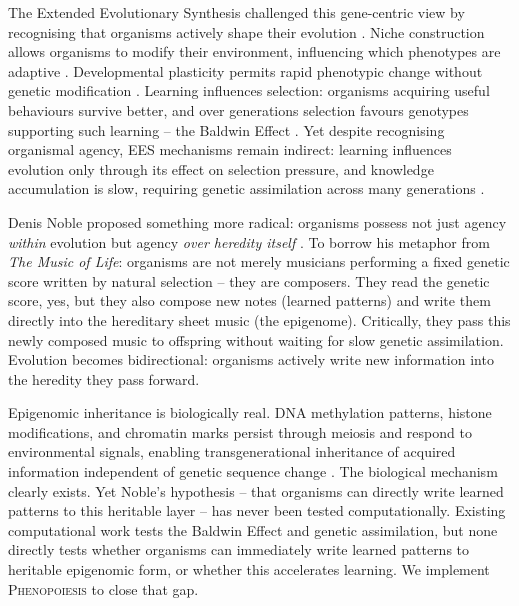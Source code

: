 \documentclass[11pt]{article}
\newcommand{\Pheno}{\textsc{Phenopoiesis}}
\begin{document}
The Extended Evolutionary Synthesis challenged this gene-centric view by
recognising that organisms actively shape their evolution
\citep{LalandEtAl2015,Uller2015,WestEberhard2003}. Niche construction allows
organisms to modify their environment, influencing which phenotypes are adaptive
\citep{OdlingSmee2003}. Developmental plasticity permits rapid phenotypic change
without genetic modification \citep{WestEberhard2003,FuscoMinelli2010}. Learning
influences selection: organisms acquiring useful behaviours survive better, and
over generations selection favours genotypes supporting such learning -- the
Baldwin Effect \citep{Baldwin1896,HintonNowlan1987}. Yet despite recognising
organismal agency, EES mechanisms remain indirect: learning influences evolution
only through its effect on selection pressure, and knowledge accumulation is
slow, requiring genetic assimilation across many generations
\citep{Waddington1942,Waddington1956}.

Denis Noble proposed something more radical: organisms possess not just agency
\emph{within} evolution but agency \emph{over heredity itself}
\citep{Noble2016,Noble2017,Noble2021}. To borrow his metaphor from \emph{The
Music of Life}: organisms are not merely musicians performing a fixed genetic
score written by natural selection -- they are composers. They read the genetic
score, yes, but they also compose new notes (learned patterns) and write them
directly into the hereditary sheet music (the epigenome). Critically, they pass
this newly composed music to offspring without waiting for slow genetic
assimilation. Evolution becomes bidirectional: organisms actively write new
information into the heredity they pass forward.

Epigenomic inheritance is biologically real. DNA methylation patterns, histone
modifications, and chromatin marks persist through meiosis and respond to
environmental signals, enabling transgenerational inheritance of acquired
information independent of genetic sequence change
\citep{Pembrey2006,Rakyan2002,WaterlandJirtle2007,Gibney2010,Jablonka2014}. The
biological mechanism clearly exists. Yet Noble's hypothesis -- that organisms can
directly write learned patterns to this heritable layer -- has never been tested
computationally. Existing computational work tests the Baldwin Effect
\citep{Baldwin1896,HintonNowlan1987,Suzuki2007} and genetic assimilation, but
none directly tests whether organisms can immediately write learned patterns to
heritable epigenomic form, or whether this accelerates learning. We implement
\Pheno{} to close that gap.
\end{document}
